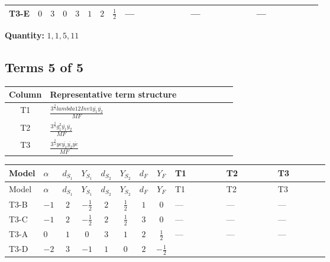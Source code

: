 \documentclass[8pt]{article}
\begin{document}
\begin{landscape}
\begin{longtable}{@{}llcccccc >{\raggedright\arraybackslash}p{0.21\linewidth} >{\raggedright\arraybackslash}p{0.21\linewidth} >{\raggedright\arraybackslash}p{0.21\linewidth}@{}}
\midrule
T3-E & $0$ & $3$ & $0$ & $3$ & $1$ & $2$ & $\frac{1}{2}$ & --- & --- & --- \\
\midrule
\bottomrule
\end{longtable}
\clearpage
\noindent\textbf{Quantity: }$\mathrm{1,1,5,11}$\par\smallskip
\subsection*{Terms 5 of 5}
\begin{center}
\begin{tabular}{@{}c >{\raggedright\arraybackslash}p{0.82\linewidth}@{}}
\toprule
Column & Representative term structure \\
\midrule
T1 & \(\displaystyle \frac{3^{\frac{3}{4}} lambda12Inv1 \overline{y_{1}} \overline{y_{2}}}{MF}\) \\
\midrule
T2 & \(\displaystyle \frac{3^{\frac{3}{4}} g_{1}^{2} \overline{y_{1}} \overline{y_{2}}}{MF}\) \\
\midrule
T3 & \(\displaystyle \frac{3^{\frac{3}{4}} ye \overline{y_{1}} \overline{y_{2}} \overline{ye}}{MF}\) \\
\midrule
\bottomrule
\end{tabular}
\end{center}
\smallskip
\tiny
\begin{longtable}{@{}llcccccc >{\raggedright\arraybackslash}p{0.21\linewidth} >{\raggedright\arraybackslash}p{0.21\linewidth} >{\raggedright\arraybackslash}p{0.21\linewidth}@{}}
\toprule
Model & $\alpha$ & $d_{S_1}$ & $Y_{S_1}$ & $d_{S_2}$ & $Y_{S_2}$ & $d_F$ & $Y_F$ & T1 & T2 & T3 \\
\midrule
\endfirsthead
\toprule
Model & $\alpha$ & $d_{S_1}$ & $Y_{S_1}$ & $d_{S_2}$ & $Y_{S_2}$ & $d_F$ & $Y_F$ & T1 & T2 & T3 \\
\midrule
\endhead
T3-B & $-1$ & $2$ & $-\frac{1}{2}$ & $2$ & $\frac{1}{2}$ & $1$ & $0$ & --- & --- & --- \\
\midrule
T3-C & $-1$ & $2$ & $-\frac{1}{2}$ & $2$ & $\frac{1}{2}$ & $3$ & $0$ & --- & --- & --- \\
\midrule
T3-A & $0$ & $1$ & $0$ & $3$ & $1$ & $2$ & $\frac{1}{2}$ & --- & --- & --- \\
\midrule
T3-D & $-2$ & $3$ & $-1$ & $1$ & $0$ & $2$ & $-\frac{1}{2}$ & \scriptsize\adjustbox{max width=\linewidth}{$\begin{gathered} - \frac{3^{\frac{3}{4}} lambda12Inv1 \overline{y_{1}} \overline{y_{2}}}{6 MF}\end{gathered}$} & \scriptsize\adjustbox{max width=\linewidth}{$\begin{gathered} - \frac{3^{\frac{3}{4}} g_{1}^{2} \overline{y_{1}} \overline{y_{2}}}{8 MF}\end{gathered}$} & \scriptsize\adjustbox{max width=\linewidth}{$\begin{gathered} \frac{3^{\frac{3}{4}} ye \overline{y_{1}} \overline{y_{2}} \overline{ye}}{12 MF}\end{gathered}$} \\

\end{longtable}
\end{landscape}
\end{document}

